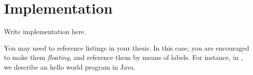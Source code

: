 \chapter{Implementation} 
\label{chap:implementation}

Write implementation here.


You may need to reference listings in your thesis.
%
In this case, you are encouraged to make them \emph{floating}, and reference them by means of labels.
%
For instance, in , we describe an hello world program in Java.
